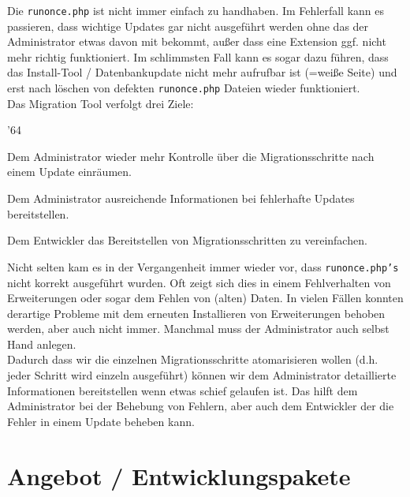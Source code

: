 \documentclass[
paper=a4,
draft=false,%
fontsize=10pt%
]{scrartcl}
\begin{document}
Die \texttt{runonce.php} ist nicht immer einfach zu handhaben. Im Fehlerfall kann es passieren, dass wichtige Updates gar nicht ausgeführt werden ohne das der Administrator etwas davon mit bekommt, außer dass eine Extension ggf. nicht mehr richtig funktioniert. Im schlimmsten Fall kann es sogar dazu führen, dass das Install-Tool / Datenbankupdate nicht mehr aufrufbar ist (=weiße Seite) und erst nach löschen von defekten \texttt{runonce.php} Dateien wieder funktioniert.\\
Das Migration Tool verfolgt drei Ziele:

\begin{dinglist}{'64}
\item Dem Administrator wieder mehr Kontrolle über die Migrationsschritte nach einem Update einräumen.
\item Dem Administrator ausreichende Informationen bei fehlerhafte Updates bereitstellen.
\item Dem Entwickler das Bereitstellen von Migrationsschritten zu vereinfachen.
\end{dinglist}

Nicht selten kam es in der Vergangenheit immer wieder vor, dass \texttt{runonce.php's} nicht korrekt ausgeführt wurden. Oft zeigt sich dies in einem Fehlverhalten von Erweiterungen oder sogar dem Fehlen von (alten) Daten. In vielen Fällen konnten derartige Probleme mit dem erneuten Installieren von Erweiterungen behoben werden, aber auch nicht immer. Manchmal muss der Administrator auch selbst Hand anlegen.\\
Dadurch dass wir die einzelnen Migrationsschritte atomarisieren wollen (d.h. jeder Schritt wird einzeln ausgeführt) können wir dem Administrator detaillierte Informationen bereitstellen wenn etwas schief gelaufen ist. Das hilft dem Administrator bei der Behebung von Fehlern, aber auch dem Entwickler der die Fehler in einem Update beheben kann.

%
%

\newpage

\section{Angebot / Entwicklungspakete}
\label{sec:offer}

%
%
\end{document}

